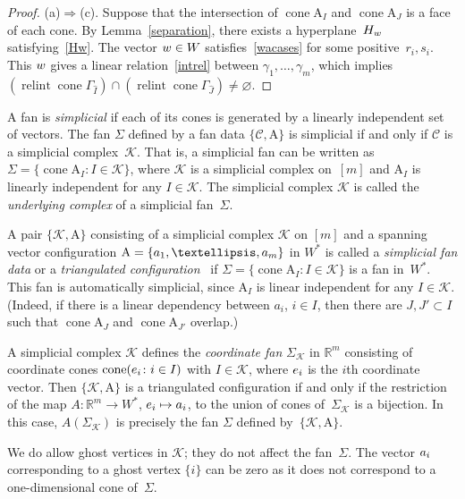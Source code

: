 \documentclass[a4paper]{amsart}
\theoremstyle{definition}
\theoremstyle{remark}
\numberwithin{equation}{section}
\def\R{\mathbb R}
\def\R{\mathbb R}
\def\sK{\mathcal K}
\newcommand{\mb}[1]{{\textbf {\textit#1}}}
\def\cone{\mathop{\mathrm{cone}}}
\def\relint{\mathop{\mathrm{relint}}}
\newcommand{\<}{\langle}
\renewcommand{\>}{\rangle}
\begin{document}
\begin{proof}
(a)$\Rightarrow$(c).
Suppose that the intersection of $\cone\mathrm A_I$ and $\cone\mathrm A_J$ is a face of each cone. By Lemma~\ref{separation}, there exists a hyperplane~$H_{\mb w}$ satisfying~\eqref{Hw}. The vector $\mb w\in W$ satisfies~\eqref{wacases} for some positive~$r_i,s_i$. This $\mb w$ gives a linear relation~\eqref{intrel} between $\gamma_1,\ldots,\gamma_m$, which implies
$(\relint\cone\Gamma_{\widehat I})\cap(\relint\cone\Gamma_{\widehat J})\ne\varnothing$.
\end{proof}


A fan is \emph{simplicial} if each of its cones is generated by a linearly independent set of vectors. The fan $\Sigma$ defined by a fan data $\{\mathcal C,\mathrm A\}$ is simplicial if and only if $\mathcal C$ is a simplicial complex~$\mathcal K$. That is, a simplicial fan can be written as $\Sigma=\{\cone\mathrm A_I\colon I\in\mathcal K\}$, where $\mathcal K$ is a simplicial complex on~$[m]$ and $\mathrm A_I$ is linearly independent for any $I\in\sK$.  The simplicial complex $\sK$ is called the \emph{underlying complex} of a simplicial fan~$\Sigma$. 

A pair $\{\mathcal K,\mathrm A\}$ consisting of a simplicial complex $\mathcal K$ on $[m]$ and a spanning vector configuration $\mathrm A=\{\mb a_1,\ldots,\mb a_m\}$ in $W^*$ is called a \emph{simplicial fan data} or a 
\emph{triangulated configuration}~\cite{ba-za15} if $\Sigma=\{\cone\mathrm A_I\colon I\in\mathcal K\}$ is a fan in~$W^*$. This fan is automatically simplicial, since $\mathrm A_I$
is linear independent for any $I\in\sK$. (Indeed, if there is a linear dependency between $a_i$, $i\in I$, then there are $J,J'\subset I$ such that $\cone\mathrm A_J$ and $\cone\mathrm A_{J'}$ overlap.) 

A simplicial complex $\sK$ defines the \emph{coordinate fan} $\Sigma_\sK$ in $\R^m$ consisting of coordinate cones $\cone(\mb e_i\colon i\in I)$ with $I\in\sK$, where $\mb e_i$ is the $i$th coordinate vector. Then $\{\sK,\mathrm A\}$ is a triangulated configuration if and only if the restriction of the map $A\colon\R^m\to W^*$, $\mb e_i\mapsto\mb a_i$, 
to the union of cones of~$\Sigma_\sK$ is a bijection. In this case, $A(\Sigma_\sK)$ is precisely the fan $\Sigma$ defined by~$\{\mathcal K,\mathrm A\}$.

We do allow ghost vertices in $\sK$; they do not affect the fan~$\Sigma$. The vector $\mb a_i$ corresponding to a ghost vertex $\{i\}$ can be zero as it does not correspond to a one-dimensional cone of~$\Sigma$.
\end{document}
